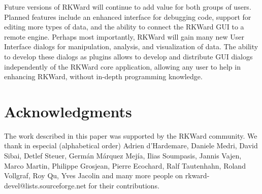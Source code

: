 
Future versions of RKWard will continue to add value for both groups of users. Planned features include
an enhanced interface for debugging  code, support for editing more types of data, and the
ability to connect the RKWard GUI to a remote  engine. Perhaps most importantly, RKWard will
gain many new User Interface dialogs for manipulation, analysis, and visualization of data. The ability to
develop these dialogs as plugins allows to develop and distribute GUI dialogs
independently of the RKWard core application, allowing any user to help in enhancing RKWard, without in-depth
programming knowledge.

\section{Acknowledgments}
\label{sec:acknowledgments}
The work described in this paper was supported by the RKWard community. We thank in especial (alphabetical order) Adrien d'Hardemare, 
Daniele Medri, David Sibai, Detlef Steuer, Germ\'an M\'arquez Mej\'ia, Ilias Soumpasis, Jannis Vajen, Marco Martin, 
Philippe Grosjean, Pierre Ecochard, Ralf Tautenhahn, Roland Vollgraf, Roy Qu, Yves Jacolin and many more people on 
rkward-devel@lists.sourceforge.net for their contributions.
